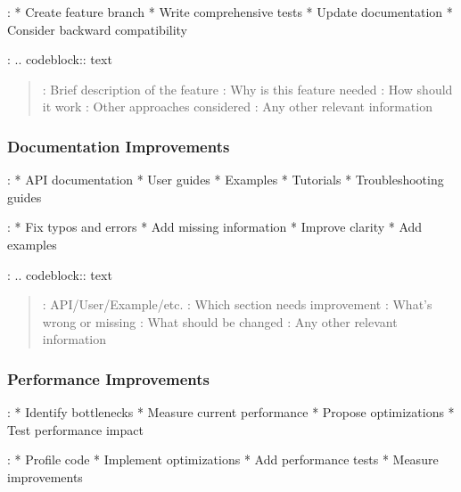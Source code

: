\documentclass[a4paper,10pt,english,openany,oneside]{sphinxmanual}
\begin{document}
\sphinxAtStartPar
{}:
* Create feature branch
* Write comprehensive tests
* Update documentation
* Consider backward compatibility

\sphinxAtStartPar
{}:
.. code\sphinxhyphen{}block:: text
\begin{quote}

\sphinxAtStartPar
{}: Brief description of the feature
: Why is this feature needed
: How should it work
: Other approaches considered
: Any other relevant information
\end{quote}


\subsubsection{Documentation Improvements}
\label{\detokenize{contributing:documentation-improvements}}
\sphinxAtStartPar
{}:
* API documentation
* User guides
* Examples
* Tutorials
* Troubleshooting guides

\sphinxAtStartPar
{}:
* Fix typos and errors
* Add missing information
* Improve clarity
* Add examples

\sphinxAtStartPar
{}:
.. code\sphinxhyphen{}block:: text
\begin{quote}

\sphinxAtStartPar
{}: API/User/Example/etc.
: Which section needs improvement
: What’s wrong or missing
: What should be changed
: Any other relevant information
\end{quote}


\subsubsection{Performance Improvements}
\label{\detokenize{contributing:performance-improvements}}
\sphinxAtStartPar
{}:
* Identify bottlenecks
* Measure current performance
* Propose optimizations
* Test performance impact

\sphinxAtStartPar
{}:
* Profile code
* Implement optimizations
* Add performance tests
* Measure improvements
\end{document}
